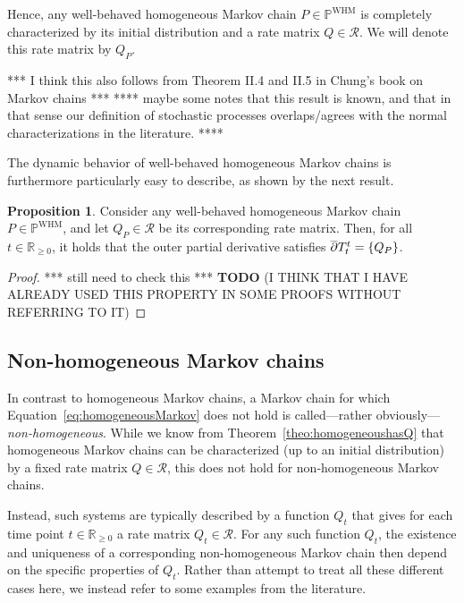 \documentclass[10pt,a4paper]{paper}
\theoremstyle{definition}
\newtheorem{proposition}[theorem]{Proposition}
\newcommand{\reals}{\mathbb{R}}
\newcommand{\realsnonneg}{\reals_{\geq 0}}
\newcommand{\processes}{\mathbb{P}}
\newcommand{\whmprocesses}{\processes^{\mathrm{WHM}}}
\begin{document}
Hence, any well-behaved homogeneous Markov chain $P\in\whmprocesses$ is completely characterized by its initial distribution and a rate matrix $Q\in\mathcal{R}$. We will denote this rate matrix by $Q_P$.

*** I think this also follows from Theorem II.4 and II.5 in Chung's book on Markov chains ***
**** maybe some notes that this result is known, and that in that sense our definition of stochastic processes overlaps/agrees with the normal characterizations in the literature. ****

The dynamic behavior of well-behaved homogeneous Markov chains is furthermore particularly easy to describe, as shown by the next result.
\begin{proposition}\label{prop:Q_is_singleton_deriv_for_homogen}
Consider any well-behaved homogeneous Markov chain $P\in\whmprocesses$, and let $Q_P\in\mathcal{R}$ be its corresponding rate matrix. Then, for all $t\in\realsnonneg$, it holds that the outer partial derivative satisfies $\smash{\overline{\partial}}T_t^t=\{Q_P\}$.
\end{proposition}
\begin{proof}
*** still need to check this *** {\bf TODO} (I THINK THAT I HAVE ALREADY USED THIS PROPERTY IN SOME PROOFS WITHOUT REFERRING TO IT)
\end{proof}

\subsection{Non-homogeneous Markov chains}\label{sec:nonhomogen_markov}

In contrast to homogeneous Markov chains, a Markov chain for which Equation~\eqref{eq:homogeneousMarkov} does not hold is called---rather obviously---\emph{non-homogeneous}. While we know from Theorem~\ref{theo:homogeneoushasQ} that homogeneous Markov chains can be characterized (up to an initial distribution) by a fixed rate matrix $Q\in\mathcal{R}$, this does not hold for non-homogeneous Markov chains. 

Instead, such systems are typically described by a function $Q_t$ that gives for each time point $t\in\realsnonneg$ a rate matrix $Q_t\in\mathcal{R}$. For any such function $Q_t$, the existence and uniqueness of a corresponding non-homogeneous Markov chain then depend on the specific properties of $Q_t$. Rather than attempt to treat all these different cases here, we instead refer to some examples from the literature. 
\end{document}
